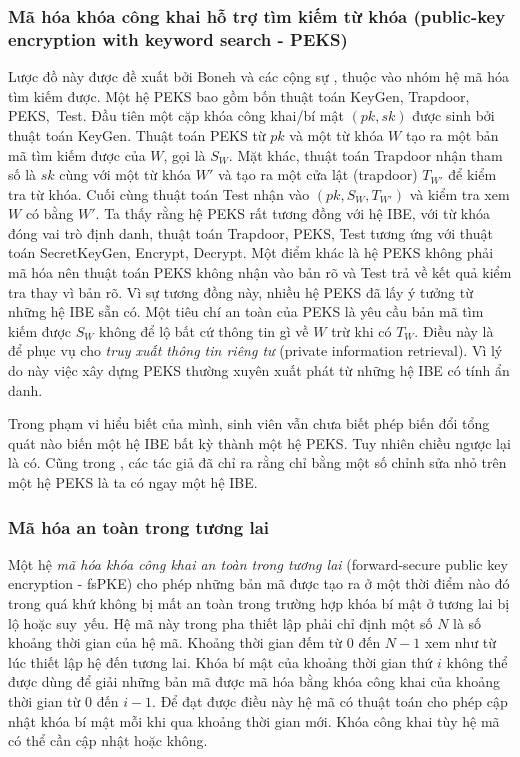 \documentclass[class=report, crop=false]{standalone}
\begin{document}
			\subsubsection{Mã hóa khóa công khai hỗ trợ tìm kiếm từ khóa (public-key encryption with keyword search - PEKS)}
				\vspace{-0.5\baselineskip}
				Lược đồ này được đề xuất bởi Boneh và các cộng sự \cite{DBLP:conf/eurocrypt/BonehCOP04}, thuộc vào nhóm hệ mã hóa tìm kiếm được. Một hệ PEKS bao gồm bốn thuật toán \textsf{KeyGen, Trapdoor, PEKS,~Test}. Đầu tiên một cặp khóa công khai/bí mật $(pk, sk)$ được sinh bởi thuật toán \textsf{KeyGen}. Thuật toán \textsf{PEKS} từ $pk$ và một từ khóa $W$ tạo ra một bản mã tìm kiếm được của $W$, gọi là $S_W$. Mặt khác, thuật toán \textsf{Trapdoor} nhận tham số là $sk$ cùng với một từ khóa $W'$ và tạo ra một cửa lật (trapdoor) $T_{W'}$ để kiểm tra từ khóa. Cuối cùng thuật toán \textsf{Test} nhận vào $(pk, S_W, T_{W'})$ và kiểm tra xem $W$ có bằng $W'$.
				\newpage
				Ta thấy rằng hệ PEKS rất tương đồng với hệ IBE, với từ khóa đóng vai trò định danh, thuật toán \textsf{Trapdoor, PEKS, Test} tương ứng với thuật toán \textsf{SecretKeyGen, Encrypt, Decrypt}. Một điểm khác là hệ PEKS không phải mã hóa nên thuật toán \textsf{PEKS} không nhận vào bản rõ và \textsf{Test} trả về kết quả kiểm tra thay vì bản rõ. Vì sự tương đồng này, nhiều hệ PEKS đã lấy ý tưởng từ những hệ IBE sẵn có. Một tiêu chí an toàn của PEKS là yêu cầu bản mã tìm kiếm được $S_W$ không để lộ bất cứ thông tin gì về $W$ trừ khi có $T_W$. Điều này là để phục vụ cho \textit{truy xuất thông tin riêng tư} (private information retrieval). Vì lý do này việc xây dựng PEKS thường xuyên xuất phát từ những hệ IBE có tính ẩn danh.
			
				Trong phạm vi hiểu biết của mình, sinh viên vẫn chưa biết phép biến đổi tổng quát nào biến một hệ IBE bất kỳ thành một hệ PEKS. Tuy nhiên chiều ngược lại là có. Cũng trong \cite{DBLP:conf/eurocrypt/BonehCOP04}, các tác giả đã chỉ ra rằng chỉ bằng một số chỉnh sửa nhỏ trên một hệ PEKS là ta có ngay một hệ IBE.
			\vspace{-\baselineskip}
			\subsubsection{Mã hóa an toàn trong tương lai}
				\vspace{-0.5\baselineskip}
				Một hệ \textit{mã hóa khóa công khai an toàn trong tương lai} (forward-secure public key encryption - fsPKE) cho phép những bản mã được tạo ra ở một thời điểm nào đó trong quá khứ không bị mất an toàn trong trường hợp khóa bí mật ở tương lai bị lộ hoặc suy~yếu. Hệ mã này trong pha thiết lập phải chỉ định một số $N$ là số khoảng thời gian của hệ mã. Khoảng thời gian đếm từ 0 đến $N - 1$ xem như từ lúc thiết lập hệ đến tương lai. Khóa bí mật của khoảng thời gian thứ $i$ không thể được dùng để giải những bản mã được mã hóa bằng khóa công khai của khoảng thời gian từ $0$ đến $i - 1$. Để đạt được điều này hệ mã có thuật toán cho phép cập nhật khóa bí mật mỗi khi qua khoảng thời gian mới. Khóa công khai tùy hệ mã có thể cần cập nhật hoặc không.
\end{document}
